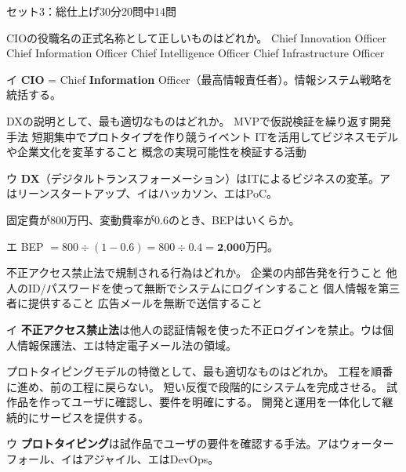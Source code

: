 
\begin{mogishi}{セット3：総仕上げ}{30分}{20問中14問}

\begin{itpmon}[\diffbadge{標}]{CIOの役職名の正式名称として正しいものはどれか。}
\sentakushi
  {Chief Innovation Officer}
  {Chief Information Officer}
  {Chief Intelligence Officer}
  {Chief Infrastructure Officer}
\end{itpmon}
\begin{kaisetsu}{イ}
\textbf{CIO} = Chief \textbf{Information} Officer（最高情報責任者）。情報システム戦略を統括する。
\end{kaisetsu}

\begin{itpmon}[\diffbadge{強}]{DXの説明として、最も適切なものはどれか。}
\sentakushi
  {MVPで仮説検証を繰り返す開発手法}
  {短期集中でプロトタイプを作り競うイベント}
  {ITを活用してビジネスモデルや企業文化を変革すること}
  {概念の実現可能性を検証する活動}
\end{itpmon}
\begin{kaisetsu}{ウ}
\textbf{DX}（デジタルトランスフォーメーション）はITによるビジネスの変革。アはリーンスタートアップ、イはハッカソン、エはPoC。
\end{kaisetsu}

\begin{itpmon}[\diffbadge{強}]{固定費が800万円、変動費率が0.6のとき、BEPはいくらか。}
\end{itpmon}
\begin{kaisetsu}{エ}
BEP $= 800 \div (1 - 0.6) = 800 \div 0.4 = \textbf{2{,}000}$万円。
\end{kaisetsu}

\begin{itpmon}[\diffbadge{標}]{不正アクセス禁止法で規制される行為はどれか。}
\sentakushi
  {企業の内部告発を行うこと}
  {他人のID/パスワードを使って無断でシステムにログインすること}
  {個人情報を第三者に提供すること}
  {広告メールを無断で送信すること}
\end{itpmon}
\begin{kaisetsu}{イ}
\textbf{不正アクセス禁止法}は他人の認証情報を使った不正ログインを禁止。ウは個人情報保護法、エは特定電子メール法の領域。
\end{kaisetsu}

\begin{itpmon}[\diffbadge{標}]{プロトタイピングモデルの特徴として、最も適切なものはどれか。}
\sentakushi
  {工程を順番に進め、前の工程に戻らない。}
  {短い反復で段階的にシステムを完成させる。}
  {試作品を作ってユーザに確認し、要件を明確にする。}
  {開発と運用を一体化して継続的にサービスを提供する。}
\end{itpmon}
\begin{kaisetsu}{ウ}
\textbf{プロトタイピング}は試作品でユーザの要件を確認する手法。アはウォーターフォール、イはアジャイル、エはDevOps。
\end{kaisetsu}


\end{mogishi}
